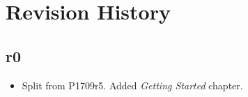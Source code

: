 \section{Revision History}

\subsection*{\paperno r0}

\begin{itemize}
      \item Split from P1709r5. Added \textit{Getting Started} chapter.
\end{itemize}

